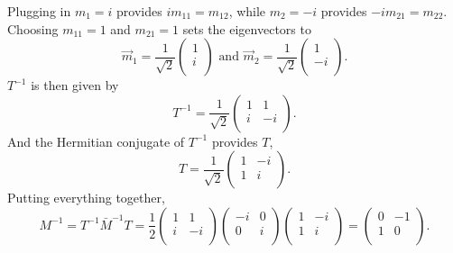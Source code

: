 \documentclass[12pt]{article}
\begin{document}
Plugging in $m_1=i$ provides $im_{11} = m_{12}$, while $m_2=-i$ provides $-im_{21} = m_{22}$. Choosing $m_{11} = 1$ and $m_{21} = 1$ sets the eigenvectors to 
\begin{equation}
\vec{m}_1 = 
\frac{1}{\sqrt{2}}
\begin{pmatrix}
1 \\ i \\
\end{pmatrix}
\text{ and }
\vec{m}_2 = 
\frac{1}{\sqrt{2}}
\begin{pmatrix}
1 \\ -i \\
\end{pmatrix}.
\end{equation}
$T^{-1}$ is then given by 
\begin{equation}
T^{-1} =
\frac{1}{\sqrt{2}}
\begin{pmatrix}
1 & 1 \\
i & -i \\
\end{pmatrix}.
\end{equation}
And the Hermitian conjugate of $T^{-1}$ provides $T$,
\begin{equation}
T =
\frac{1}{\sqrt{2}}
\begin{pmatrix}
1 & -i \\
1 & i \\
\end{pmatrix}.
\end{equation}
Putting everything together,
\begin{equation}
M^{-1} = T^{-1}\bar{M}^{-1}T =
\frac{1}{2}
\begin{pmatrix}
1 & 1 \\
i & -i \\
\end{pmatrix}
\begin{pmatrix}
-i & 0 \\
0 & i \\
\end{pmatrix}
\begin{pmatrix}
1 & -i \\
1 & i \\
\end{pmatrix}
=
\begin{pmatrix}
0 & -1 \\
1 & 0 \\
\end{pmatrix}.
\end{equation}
\end{document}
